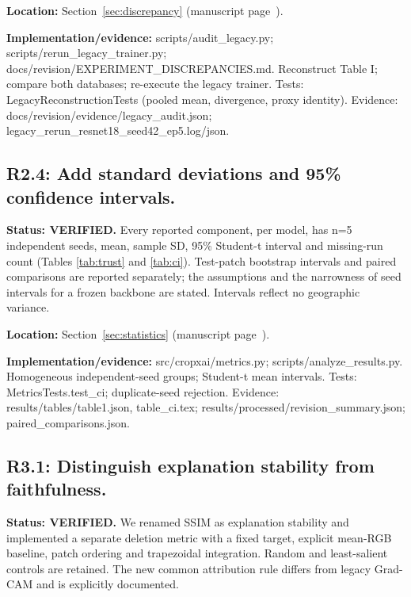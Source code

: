 \documentclass[3p,times,procedia]{elsarticle}
\begin{document}
\par\textbf{Location:} Section~\ref{sec:discrepancy} (manuscript page~\pageref{sec:discrepancy}).

\par\textbf{Implementation/evidence:} scripts/audit\_legacy.py; scripts/rerun\_legacy\_trainer.py; docs/revision/EXPERIMENT\_DISCREPANCIES.md. Reconstruct Table I; compare both databases; re-execute the legacy trainer. Tests: LegacyReconstructionTests (pooled mean, divergence, proxy identity). Evidence: docs/revision/evidence/legacy\_audit.json; legacy\_rerun\_resnet18\_seed42\_ep5.log/json.

\subsection*{R2.4: Add standard deviations and 95\% confidence intervals.}

\textbf{Status: VERIFIED.} Every reported component, per model, has n=5 independent seeds, mean, sample SD, 95\% Student-t interval and missing-run count (Tables \ref{tab:trust} and \ref{tab:ci}). Test-patch bootstrap intervals and paired comparisons are reported separately; the assumptions and the narrowness of seed intervals for a frozen backbone are stated. Intervals reflect no geographic variance.

\par\textbf{Location:} Section~\ref{sec:statistics} (manuscript page~\pageref{sec:statistics}).

\par\textbf{Implementation/evidence:} src/cropxai/metrics.py; scripts/analyze\_results.py. Homogeneous independent-seed groups; Student-t mean intervals. Tests: MetricsTests.test\_ci; duplicate-seed rejection. Evidence: results/tables/table1.json, table\_ci.tex; results/processed/revision\_summary.json; paired\_comparisons.json.

\subsection*{R3.1: Distinguish explanation stability from faithfulness.}

\textbf{Status: VERIFIED.} We renamed SSIM as explanation stability and implemented a separate deletion metric with a fixed target, explicit mean-RGB baseline, patch ordering and trapezoidal integration. Random and least-salient controls are retained. The new common attribution rule differs from legacy Grad-CAM and is explicitly documented.
\end{document}
